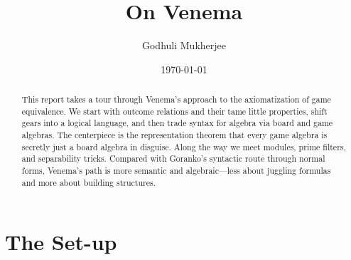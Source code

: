 \documentclass[12pt]{article}
\title{On Venema}
\author{Godhuli Mukherjee}
\date{\today}
\begin{document}
\maketitle
\begin{abstract}

This report takes a tour through Venema’s approach to the axiomatization of game equivalence. We start with outcome relations and their tame little properties, shift gears into a logical language, and then trade syntax for algebra via board and game algebras. The centerpiece is the representation theorem that every game algebra is secretly just a board algebra in disguise. Along the way we meet modules, prime filters, and separability tricks. Compared with Goranko’s syntactic route through normal forms, Venema’s path is more semantic and algebraic—less about juggling formulas and more about building structures.

\end{abstract}
\tableofcontents

\section{The Set-up}
\end{document}
